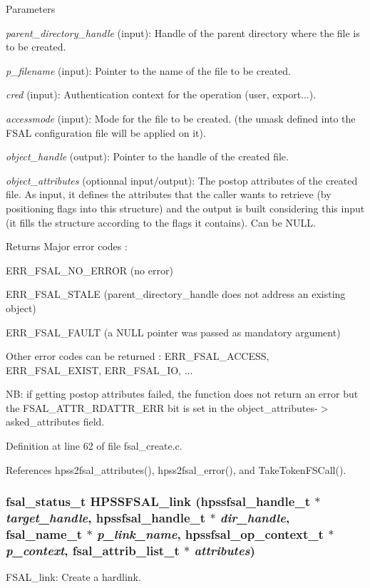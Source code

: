 \begin{DoxyParams}{Parameters}
\item[{\em parent\_\-directory\_\-handle}](input): Handle of the parent directory where the file is to be created. \item[{\em p\_\-filename}](input): Pointer to the name of the file to be created. \item[{\em cred}](input): Authentication context for the operation (user, export...). \item[{\em accessmode}](input): Mode for the file to be created. (the umask defined into the FSAL configuration file will be applied on it). \item[{\em object\_\-handle}](output): Pointer to the handle of the created file. \item[{\em object\_\-attributes}](optionnal input/output): The postop attributes of the created file. As input, it defines the attributes that the caller wants to retrieve (by positioning flags into this structure) and the output is built considering this input (it fills the structure according to the flags it contains). Can be NULL.\end{DoxyParams}
\begin{DoxyReturn}{Returns}
Major error codes :
\begin{DoxyItemize}
\item ERR\_\-FSAL\_\-NO\_\-ERROR (no error)
\item ERR\_\-FSAL\_\-STALE (parent\_\-directory\_\-handle does not address an existing object)
\item ERR\_\-FSAL\_\-FAULT (a NULL pointer was passed as mandatory argument)
\item Other error codes can be returned : ERR\_\-FSAL\_\-ACCESS, ERR\_\-FSAL\_\-EXIST, ERR\_\-FSAL\_\-IO, ...
\end{DoxyItemize}
\end{DoxyReturn}
NB: if getting postop attributes failed, the function does not return an error but the FSAL\_\-ATTR\_\-RDATTR\_\-ERR bit is set in the object\_\-attributes-\/$>$asked\_\-attributes field. 

Definition at line 62 of file fsal\_\-create.c.

References hpss2fsal\_\-attributes(), hpss2fsal\_\-error(), and TakeTokenFSCall().
\subsubsection[{HPSSFSAL\_\-link}]{\setlength{\rightskip}{0pt plus 5cm}fsal\_\-status\_\-t HPSSFSAL\_\-link (hpssfsal\_\-handle\_\-t $\ast$ {\em target\_\-handle}, \/  hpssfsal\_\-handle\_\-t $\ast$ {\em dir\_\-handle}, \/  fsal\_\-name\_\-t $\ast$ {\em p\_\-link\_\-name}, \/  hpssfsal\_\-op\_\-context\_\-t $\ast$ {\em p\_\-context}, \/  fsal\_\-attrib\_\-list\_\-t $\ast$ {\em attributes})}\label{fsal__create_8c_a04f6294c3045429a1c2f18a04297af13}
FSAL\_\-link: Create a hardlink.


